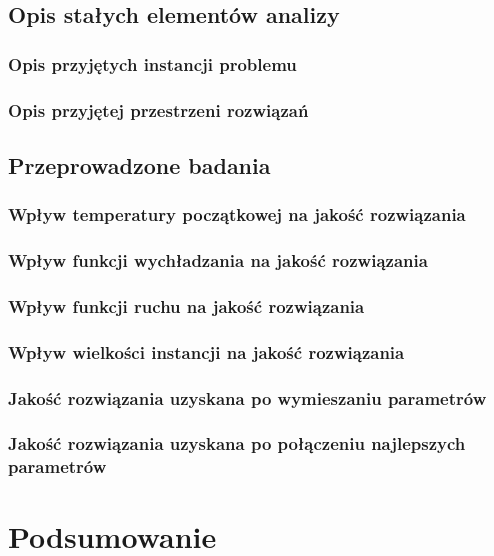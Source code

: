 \section{Opis stałych elementów analizy}
\subsection{Opis przyjętych instancji problemu}
\subsection{Opis przyjętej przestrzeni rozwiązań}
\section{Przeprowadzone badania}
\subsection{Wpływ temperatury początkowej na jakość rozwiązania}
\subsection{Wpływ funkcji wychładzania na jakość rozwiązania}
\subsection{Wpływ funkcji ruchu na jakość rozwiązania}
\subsection{Wpływ wielkości instancji na jakość rozwiązania}
\subsection{Jakość rozwiązania uzyskana po wymieszaniu parametrów}
\subsection{Jakość rozwiązania uzyskana po połączeniu najlepszych parametrów}

\chapter{Podsumowanie}
